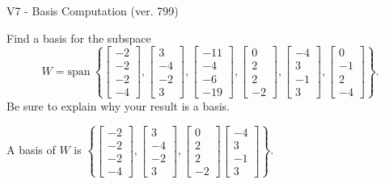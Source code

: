 \begin{exercise}
  \begin{exerciseTitle}V7 - Basis Computation (ver. 799)\end{exerciseTitle}
  \begin{exerciseStatement}
    Find a basis for the subspace 
\[W=\mathrm{span}\ \left\{\left[\begin{array}{r}
-2 \\
-2 \\
-2 \\
-4
\end{array}\right] , \left[\begin{array}{r}
3 \\
-4 \\
-2 \\
3
\end{array}\right] , \left[\begin{array}{r}
-11 \\
-4 \\
-6 \\
-19
\end{array}\right] , \left[\begin{array}{r}
0 \\
2 \\
2 \\
-2
\end{array}\right] , \left[\begin{array}{r}
-4 \\
3 \\
-1 \\
3
\end{array}\right] , \left[\begin{array}{r}
0 \\
-1 \\
2 \\
-4
\end{array}\right]\right\}.\]
 Be sure to explain why your result is a basis.


  \end{exerciseStatement}
  \begin{exerciseAnswer}
   A basis of \(W\) is  \(\left\{\left[\begin{array}{r}
-2 \\
-2 \\
-2 \\
-4
\end{array}\right] , \left[\begin{array}{r}
3 \\
-4 \\
-2 \\
3
\end{array}\right] , \left[\begin{array}{r}
0 \\
2 \\
2 \\
-2
\end{array}\right] \left[\begin{array}{r}
-4 \\
3 \\
-1 \\
3
\end{array}\right]\right\}\).
  


  \end{exerciseAnswer}
\end{exercise}